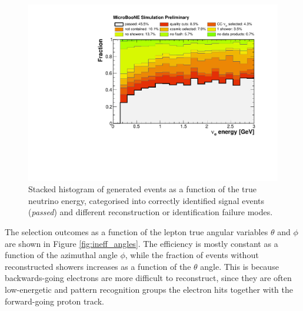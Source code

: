 \begin{figure}
\centering
  \includegraphics[width=0.8\linewidth]{figures/ineff_ene.pdf}
  \caption{Stacked histogram of generated events as a function of the true neutrino energy, categorised into correctly identified signal events {(\emph{passed})} and different reconstruction or identification failure modes.}
  \label{fig:ineff}
\end{figure}

The selection outcomes as a function of the lepton true angular variables $\theta$ and $\phi$ are shown in Figure \ref{fig:ineff_angles}. The efficiency is mostly constant as a function of the azimuthal angle $\phi$, while the fraction of events without reconstructed showers increases as a function of the $\theta$ angle. This is because backwards-going electrons are more difficult to reconstruct, since they are often low-energetic and pattern recognition groups the electron hits together with the forward-going proton track.

